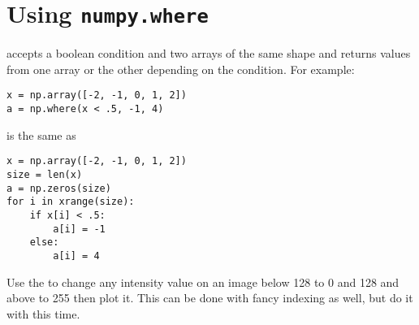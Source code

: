 \section*{Using \texttt{numpy.where}}
 accepts a boolean condition and two arrays of the same shape and returns values from one array or the other depending on the condition.
For example:
\begin{lstlisting}
x = np.array([-2, -1, 0, 1, 2])
a = np.where(x < .5, -1, 4)
\end{lstlisting}
is the same as
\begin{lstlisting}
x = np.array([-2, -1, 0, 1, 2])
size = len(x)
a = np.zeros(size)
for i in xrange(size):
    if x[i] < .5:
        a[i] = -1
    else:
        a[i] = 4
\end{lstlisting}

\begin{problem}
Use the  to change any intensity value on an image below 128 to 0 and 128 and above to 255 then plot it.
This can be done with fancy indexing as well, but do it with  this time.
\end{problem}
